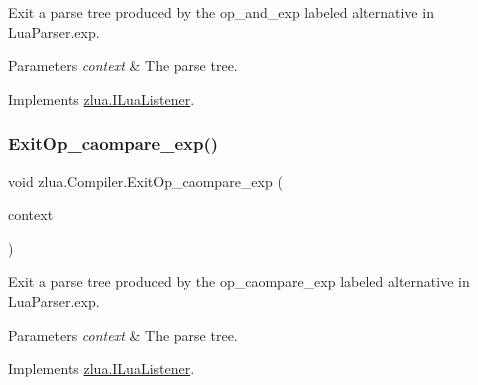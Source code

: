 Exit a parse tree produced by the {\ttfamily op\+\_\+and\+\_\+exp} labeled alternative in Lua\+Parser.\+exp. 


\begin{DoxyParams}{Parameters}
{\em context} & The parse tree.\\
\hline
\end{DoxyParams}


Implements \mbox{\hyperlink{interfacezlua_1_1_i_lua_listener_a87ea223ce3d022a98247e31bcdd4490d}{zlua.\+I\+Lua\+Listener}}.

\mbox{\label{classzlua_1_1_compiler_ad8d4d6cd82a6a48264848b8d6f88dae2}} 
\subsubsection{\texorpdfstring{Exit\+Op\+\_\+caompare\+\_\+exp()}{ExitOp\_caompare\_exp()}}
{\footnotesize\ttfamily void zlua.\+Compiler.\+Exit\+Op\+\_\+caompare\+\_\+exp (\begin{DoxyParamCaption}\item[{\mbox{[}\+Not\+Null\mbox{]} \mbox{\hyperlink{classzlua_1_1_lua_parser_1_1_op__caompare__exp_context}{Lua\+Parser.\+Op\+\_\+caompare\+\_\+exp\+Context}}}]{context }\end{DoxyParamCaption})}



Exit a parse tree produced by the {\ttfamily op\+\_\+caompare\+\_\+exp} labeled alternative in Lua\+Parser.\+exp. 


\begin{DoxyParams}{Parameters}
{\em context} & The parse tree.\\
\hline
\end{DoxyParams}


Implements \mbox{\hyperlink{interfacezlua_1_1_i_lua_listener_a9ad347c8ee340aeff0c0f8bb311cae0a}{zlua.\+I\+Lua\+Listener}}.

\mbox{\label{classzlua_1_1_compiler_ac935829de2864ba1352061c546d1c74a}} 
